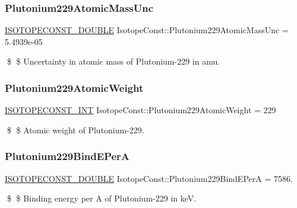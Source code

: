 \subsubsection{\texorpdfstring{Plutonium229\+Atomic\+Mass\+Unc}{Plutonium229AtomicMassUnc}}
{\footnotesize\ttfamily \mbox{\hyperlink{group___isotope_const-_macros_ga8f45a7272ce02c0b4c65c44636ed719a}{I\+S\+O\+T\+O\+P\+E\+C\+O\+N\+S\+T\+\_\+\+D\+O\+U\+B\+LE}} Isotope\+Const\+::\+Plutonium229\+Atomic\+Mass\+Unc = 5.\+4939e-\/05}

\$ \$ Uncertainty in atomic mass of Plutonium-\/229 in amu. \mbox{\label{group___isotope_const-_plutonium-_pu229_ga2da4207bd366069a6272d691930b1a31}} 
\subsubsection{\texorpdfstring{Plutonium229\+Atomic\+Weight}{Plutonium229AtomicWeight}}
{\footnotesize\ttfamily \mbox{\hyperlink{group___isotope_const-_macros_ga5f18360b3e99483a35c32d789e62621c}{I\+S\+O\+T\+O\+P\+E\+C\+O\+N\+S\+T\+\_\+\+I\+NT}} Isotope\+Const\+::\+Plutonium229\+Atomic\+Weight = 229}

\$ \$ Atomic weight of Plutonium-\/229. \mbox{\label{group___isotope_const-_plutonium-_pu229_ga67b659d2e56fc9f45c3a7e5820bef103}} 
\subsubsection{\texorpdfstring{Plutonium229\+Bind\+E\+PerA}{Plutonium229BindEPerA}}
{\footnotesize\ttfamily \mbox{\hyperlink{group___isotope_const-_macros_ga8f45a7272ce02c0b4c65c44636ed719a}{I\+S\+O\+T\+O\+P\+E\+C\+O\+N\+S\+T\+\_\+\+D\+O\+U\+B\+LE}} Isotope\+Const\+::\+Plutonium229\+Bind\+E\+PerA = 7586.}

\$ \$ Binding energy per A of Plutonium-\/229 in keV. \mbox{\label{group___isotope_const-_plutonium-_pu229_ga07ac68a94eab193b64a510bf89b629a3}} 
